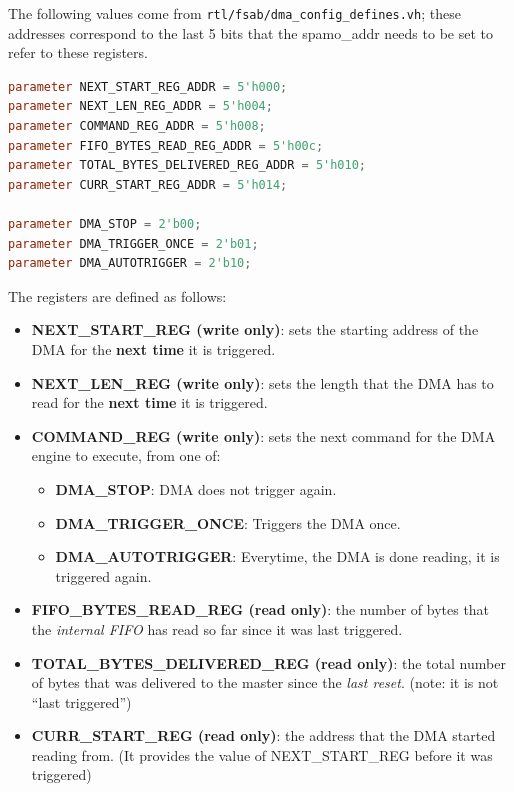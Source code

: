 \documentclass[10pt]{article}
\begin{document}
The following values come from \texttt{rtl/fsab/dma\_config\_defines.vh};
these addresses correspond to the last 5 bits that the spamo\_addr needs to
be set to refer to these registers.

\begin{lstlisting}[basicstyle=\footnotesize,language=Verilog]
parameter NEXT_START_REG_ADDR = 5'h000;
parameter NEXT_LEN_REG_ADDR = 5'h004;
parameter COMMAND_REG_ADDR = 5'h008;
parameter FIFO_BYTES_READ_REG_ADDR = 5'h00c;
parameter TOTAL_BYTES_DELIVERED_REG_ADDR = 5'h010;
parameter CURR_START_REG_ADDR = 5'h014; 

parameter DMA_STOP = 2'b00;
parameter DMA_TRIGGER_ONCE = 2'b01;
parameter DMA_AUTOTRIGGER = 2'b10;
\end{lstlisting}

The registers are defined as follows:

\begin{itemize}
\item{\textbf{NEXT\_START\_REG (write only)}: sets the starting address of
the DMA for the \textbf{next time} it is triggered.}

\item{\textbf{NEXT\_LEN\_REG (write only)}: sets the length that the DMA has
to read for the \textbf{next time} it is triggered.}

\item{\textbf{COMMAND\_REG (write only)}: sets the next command for the DMA
engine to execute, from one of:}
\begin{itemize}
\item{\textbf{DMA\_STOP}: DMA does not trigger again.}
\item{\textbf{DMA\_TRIGGER\_ONCE}: Triggers the DMA once.}
\item{\textbf{DMA\_AUTOTRIGGER}: Everytime, the DMA is done reading, it is
triggered again.}
\end{itemize}

\item{\textbf{FIFO\_BYTES\_READ\_REG (read only)}: the number of bytes that
the \textit{internal FIFO} has read so far since it was last triggered.}

\item{\textbf{TOTAL\_BYTES\_DELIVERED\_REG (read only)}: the total number of
bytes that was delivered to the master since the \textit{last reset}. (note:
it is not ``last triggered'')}

\item{\textbf{CURR\_START\_REG (read only)}: the address that the DMA
started reading from. (It provides the value of NEXT\_START\_REG before it was
triggered)}

\end{itemize}
\end{document}
